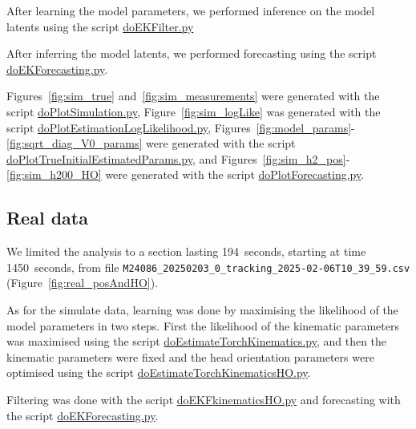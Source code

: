 \documentclass[12pt]{article}
\begin{document}
After learning the model parameters, we performed inference on the model latents
using the script
\href{https://github.com/joacorapela/lds_simulations/blob/master/code/scripts/doEKFilter.py}{doEKFilter.py}

After inferring the model latents, we performed forecasting using the script
\href{https://github.com/joacorapela/lds_simulations/blob/master/code/scripts/doEKForecasting.py}{doEKForecasting.py}.

Figures~\ref{fig:sim_true} and~\ref{fig:sim_measurements} were generated with
the script
\href{https://github.com/joacorapela/lds_simulations/blob/master/code/scripts/doPlotSimulation.py}{doPlotSimulation.py},
Figure~\ref{fig:sim_logLike} was generated with the script
    \href{https://github.com/joacorapela/lds_simulations/blob/master/code/scripts/doPlotEstimationLogLikelihood.py}{doPlotEstimationLogLikelihood.py},
    Figures~\ref{fig:model_params}-\ref{fig:sqrt_diag_V0_params} were generated
    with the script
    \href{https://github.com/joacorapela/lds_simulations/blob/master/code/scripts/doPlotTrueInitialEstimatedParams.py}{doPlotTrueInitialEstimatedParams.py},
and Figures~\ref{fig:sim_h2_pos}-\ref{fig:sim_h200_HO} were generated with the
script
\href{https://github.com/joacorapela/lds_simulations/blob/master/code/scripts/doPlotForecasting.py}{doPlotForecasting.py}.

\subsection{Real data}

We limited the analysis to a section lasting 194~seconds, starting at time
1450~seconds, from file
\texttt{M24086\_20250203\_0\_tracking\_2025-02-06T10\_39\_59.csv}
(Figure~\ref{fig:real_posAndHO}).

As for the simulate data, learning was done by maximising the likelihood of the
model parameters in two steps. First the likelihood of the kinematic parameters
was maximised using the script
\href{https://github.com/joacorapela/lds_tracking_posOriMice/blob/master/code/scripts/doEstimateTorchKinematics.py}{doEstimateTorchKinematics.py},
and then the kinematic parameters were fixed and the head orientation
parameters were optimised using the script
\href{https://github.com/joacorapela/lds_tracking_posOriMice/blob/master/code/scripts/doEstimateTorchKinematicsHO.py}{doEstimateTorchKinematicsHO.py}.

Filtering was done with the script
\href{https://github.com/joacorapela/lds_tracking_posOriMice/blob/master/code/scripts/doEKFkinematicsHO.py}{doEKFkinematicsHO.py}
and forecasting with the script
\href{https://github.com/joacorapela/lds_tracking_posOriMice/blob/master/code/scripts/doEKForecasting.py}{doEKForecasting.py}.
\end{document}
